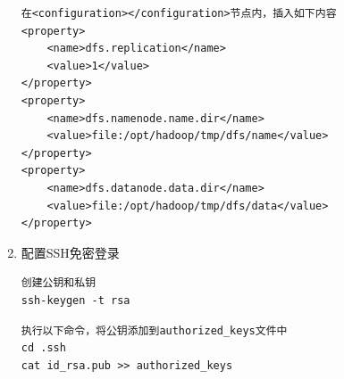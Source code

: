 \documentclass{article}
\begin{document}
\begin{enumerate}
        \begin{lstlisting}
在<configuration></configuration>节点内，插入如下内容
<property>
    <name>dfs.replication</name>
    <value>1</value>
</property>
<property>
    <name>dfs.namenode.name.dir</name>
    <value>file:/opt/hadoop/tmp/dfs/name</value>
</property>
<property>
    <name>dfs.datanode.data.dir</name>
    <value>file:/opt/hadoop/tmp/dfs/data</value>
</property>
        \end{lstlisting}
    \item 配置SSH免密登录
    \begin{lstlisting}
创建公钥和私钥
ssh-keygen -t rsa
    \end{lstlisting}
    \begin{lstlisting}
执行以下命令，将公钥添加到authorized_keys文件中
cd .ssh
cat id_rsa.pub >> authorized_keys
    \end{lstlisting}
    
\end{enumerate}
\end{document}
